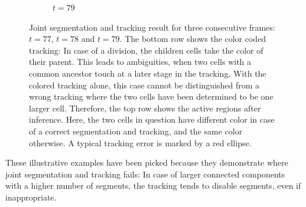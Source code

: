 \begin{figure}
\begin{subfigure}[t]{0.3\textwidth}
        \caption{$t=79$}
    \end{subfigure}
    \caption[Joint segmentation and tracking result for three consecutive frames:]{Joint
        segmentation and tracking result for three consecutive frames: $t=77$, $t=78$ and
        $t=79$. The bottom row shows the color coded tracking: In case of a division, the children
        cells take the color of their parent. This leads to ambiguities, when two cells with a
        common ancestor touch at a later stage in the tracking. With the colored tracking alone,
        this case cannot be distinguished from a wrong tracking where the two cells have been
        determined to be one larger cell. Therefore, the top row shows the active regions after
        inference. Here, the two cells in question have different color in case of a correct
        segmentation and tracking, and the same color otherwise. A typical tracking error is marked
        by a red ellipse.}
    \label{fig:joint-tracking-result}
\end{figure}

These illustrative examples have been picked because they demonstrate where joint segmentation and
tracking fails: In case of larger connected components with a higher number of segments, the
tracking tends to disable segments, even if inappropriate.

